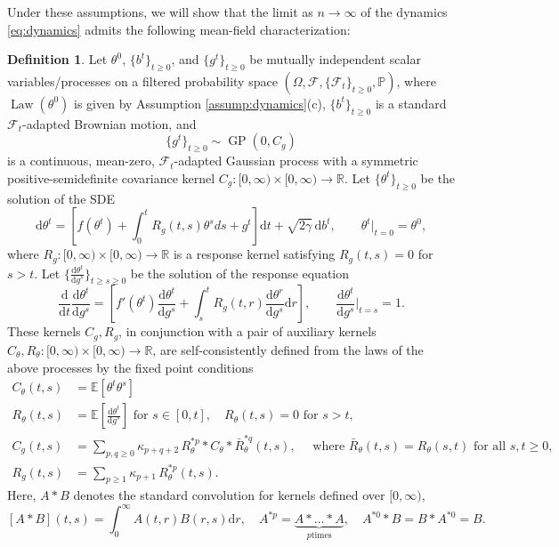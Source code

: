 \documentclass[11pt,letterpaper,reqno]{amsart}
\def\E{\mathbb{E}}
\def\P{\mathbb{P}}
\def\R{\mathbb{R}}
\def\d{\mathrm{d}}
\def\cF{\mathcal{F}}
\def\GP{\operatorname{GP}}
\def\Law{\operatorname{Law}}
\theoremstyle{definition}
\newtheorem{definition}[theorem]{Definition}
\numberwithin{equation}{section}
\begin{document}
Under these assumptions, we will show that the limit as $n \to \infty$ of
the dynamics \eqref{eq:dynamics} admits the following mean-field
characterization:

\begin{definition}\label{def:DMFT}
Let $\theta^0$, $\{b^t\}_{t \geq 0}$, and $\{g^t\}_{t \geq 0}$
be mutually independent scalar variables/processes on a filtered
probability space $(\Omega,\cF,\{\cF_t\}_{t \geq 0},\P)$, where
$\Law(\theta^0)$ is given by Assumption \ref{assump:dynamics}(c),
$\{b^t\}_{t \geq 0}$ is a standard $\cF_t$-adapted Brownian motion, and
\[\{g^t\}_{t \geq 0} \sim \GP(0,C_g)\]
is a continuous, mean-zero, $\cF_t$-adapted Gaussian process with a symmetric
positive-semidefinite covariance kernel $C_g:[0,\infty) \times [0,\infty)
\to \R$. Let $\{\theta^t\}_{t \geq 0}$ be the solution of the SDE
\begin{equation}\label{eq:dmft-theta}
\d\theta^t=\left[f(\theta^t)+\int_0^t R_g(t,s)\theta^s ds+g^t\right]
\d t+\sqrt{2 \gamma}\,\d b^t, \qquad \theta^t|_{t=0}=\theta^0,
\end{equation}
where $R_g:[0,\infty) \times [0,\infty) \to \R$
is a response kernel satisfying $R_g(t,s)=0$ for $s>t$. Let
$\{\frac{\d\theta^t}{\d g^s}\}_{t \geq s \geq 0}$ be the solution of the
response equation
\begin{equation}\label{eq:dmft-response}
\frac{\d}{\d t} \frac{\d\theta^t}{\d g^s}=\left[f'(\theta^t)\frac{\d\theta^t}{\d g^s}
+\int_s^t R_g(t,r)\frac{\d \theta^r}{\d g^s}\d r\right],
\qquad \frac{\d\theta^t}{\d g^s}\bigg|_{t=s}=1.
\end{equation}
These kernels $C_g,R_g$, in conjunction with a pair of auxiliary kernels
$C_\theta,R_\theta:[0,\infty) \times [0,\infty) \to \R$,
are self-consistently defined from the laws of the above processes by the
fixed point conditions
\begin{align}
C_\theta(t,s)&=\E[\theta^t \theta^s]\label{eq:dmft-Ctheta}\\
R_\theta(t,s)&=\E\left[\frac{\d\theta^t}{\d g^s}\right]
\text{ for } s \in [0,t],
\quad R_\theta(t,s)=0 \text{ for } s>t,
\label{eq:dmft-Rtheta}\\
C_g(t,s)&=\sum_{p,q \geq 0} \kappa_{p+q+2}\,
R_\theta^{\ast p} * C_\theta * \bar R_\theta^{\ast q}(t,s),
\quad
\text{ where } \bar R_\theta(t,s)=R_\theta(s,t) \text{ for all } s,t \geq 0,\label{eq:dmft-Cg}\\
R_g(t,s)&=\sum_{p \geq 1} \kappa_{p+1}\,R_\theta^{\ast p}(t,s).\label{eq:dmft-Rg}
\end{align}
Here, $A*B$ denotes the standard convolution for kernels defined over
$[0,\infty)$,
\[[A \ast B](t,s)=\int_0^\infty A(t,r)B(r,s)\d r,
\quad A^{\ast p}=\underbrace{A \ast \ldots \ast A}_{p \text{
times}}, \quad A^{\ast 0}*B=B*A^{\ast 0}=B.\]
\end{definition}
\end{document}
